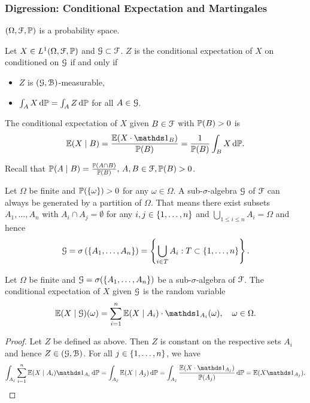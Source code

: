 \documentclass[12pt]{amsart}
\begin{document}
\subsubsection{Digression: Conditional Expectation and Martingales}
\((\Omega, \cF, \P)\) is a probability space.
\begin{definition}
    Let \(X \in L^1(\Omega, \cF, \P)\) and \(\cG \subset \cF\). \(Z\) is the conditional expectation of \(X\) on conditioned on \(\cG\) if and only if \begin{itemize}
        \item \(Z\) is \((\cG, \cB)\)-measurable,
        \item \(\intt[A][][X][\P] = \intt[A][][Z][\P]\) for all \(A \in \cG\).
    \end{itemize}
    The conditional expectation of \(X\) given \(B \in \cF\) with \(\P(B) > 0\) is \[
        \E(X \mid B) = \frac{\E(X \cdot \indic_B)}{\P(B)} = \frac{1}{\P(B)} \intt[B][][X][\P].
    \]
\end{definition}

\begin{remark}
    Recall that \(\P(A \mid B) = \frac{\P(A \cap B)}{\P(B)},\, A, B \in \cF, \P(B) > 0\).
\end{remark}
Let \(\Omega\) be finite and \(\P(\set{\omega}) > 0\) for any \(\omega \in \Omega\). A sub-\(\sigma\)-algebra \(\cG\) of \(\cF\) can always be generated by a partition of \(\Omega\). That means there exist subsets \(A_1, \dots, A_n\) with \(A_i \cap A_j = \emptyset\) for any \(i, j \in \set{1, \dots, n}\) and \(\bigcup_{1 \leq i \leq n} A_i = \Omega\) and hence \[
    \cG = \sigma\left(\set{A_1, \dots, A_n}\right) = \set{\bigcup_{i \in T} A_i: T \subset \set{1, \dots, n}}.
\]
\begin{theorem}
    Let \(\Omega\) be finite and \(\cG = \sigma(\set{A_1, \dots, A_n})\) be a sub-\(\sigma\)-algebra of \(\cF\). The conditional expectation of \(X\) given \(\cG\) is the random variable \[
        \E(X \mid \cG)(\omega) = \sum_{i=1}^n \E(X \mid A_i) \cdot \indic_{A_i}(\omega), \quad \omega \in \Omega.
    \]
\end{theorem}
\begin{proof}
    Let \(Z\) be defined as above. Then \(Z\) is constant on the respective sets \(A_i\) and hence \(Z \in (\cG, \cB)\). For all \(j \in \set{1, \dots, n}\), we have
    \begin{align*}
        \intt[A_j][][\sum_{i=1}^n \E (X \mid A_i) \indic_{A_i}][\P]
        = \intt[A_j][][\E(X \mid A_j)][\P]
        = \intt[A_j][][\frac{\E(X \cdot \indic_{A_j})}{\P(A_j)}][\P] = \E(X \indic_{A_j}).
    \end{align*}
\end{proof}
\end{document}
